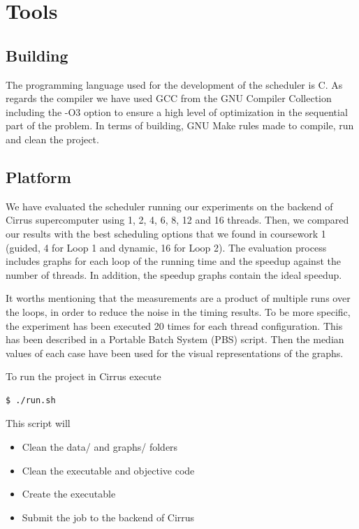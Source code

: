 \documentclass[12pt,a4paper]{article}
\begin{document}
\clearpage

\section{Tools}

\subsection{Building}
The programming language used for the development of the scheduler is C. As regards the compiler we have used GCC from the GNU Compiler Collection including the -O3 option to ensure a high level of optimization in the sequential part of the problem. In terms of building, GNU Make rules made to compile, run and clean the project.

\subsection{Platform}
We have evaluated the scheduler running our experiments on the backend of Cirrus supercomputer using 1, 2, 4, 6, 8, 12 and 16 threads. Then, we compared our results with the best scheduling options that we found in coursework 1 (guided, 4 for Loop 1 and dynamic, 16 for Loop 2). The evaluation process includes graphs for each loop of the running time and the speedup against the number of threads. In addition, the speedup graphs contain the ideal speedup.

It worths mentioning that the measurements are a product of multiple runs over the loops, in order to reduce the noise in the timing results. To be more specific, the experiment has been executed 20 times for each thread configuration. This has been described in a Portable Batch System (PBS) script. Then the median values of each case have been used for the visual representations of the graphs.

To run the project in Cirrus execute
\begin{lstlisting}[language=bash]
  $ ./run.sh
\end{lstlisting}

This script will
\begin{itemize}
  \item Clean the data/ and graphs/ folders
  \item Clean the executable and objective code
  \item Create the executable
  \item Submit the job to the backend of Cirrus
\end{itemize}
\end{document}
